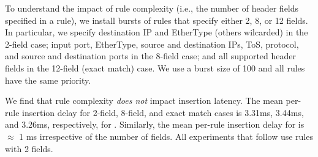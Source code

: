 
To understand the impact of rule complexity (i.e., the number of header 
fields specified in a rule), we install bursts of rules that specify either
2, 8, or 12 fields. In particular, we specify destination IP and EtherType
(others wilcarded) in the 2-field case; input port, EtherType, source and
destination IPs, ToS, protocol, and source and destination ports in the
8-field case; and all supported header fields in the 12-field (exact match)
case. We use a burst size of 100 and all rules have the same priority.


We find that rule complexity {\em does not} impact insertion latency. The
mean per-rule insertion delay for 2-field, 8-field, and exact
match cases is 3.31ms, 3.44ms, and 3.26ms, respectively, for \BroadcomOne.
Similarly, the mean per-rule insertion delay for \BroadcomThree is $\approx$ 
1 ms irrespective of the number of fields. 
All experiments that follow use rules with 2 fields.




